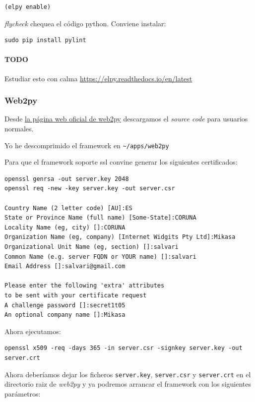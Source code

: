 \documentclass[12pt,spanish,]{scrartcl}
\let\oldparagraph\paragraph
\renewcommand{\paragraph}[1]{\oldparagraph{#1}\mbox{}}
\begin{document}
\begin{verbatim}
(elpy enable)
\end{verbatim}

\emph{flycheck} chequea el código python. Conviene instalar:

\begin{verbatim}
sudo pip install pylint
\end{verbatim}

\paragraph{TODO}\label{todo}

Estudiar esto con calma \url{https://elpy.readthedocs.io/en/latest}

\subsubsection{Web2py}\label{web2py}

Desde \href{http://www.web2py.com}{la página web oficial de web2py}
descargamos el \emph{source code} para usuarios normales.

Yo he descomprimido el framework en
\texttt{\textasciitilde{}/apps/web2py}

Para que el framework soporte ssl convine generar los siguientes
certificados:

\begin{verbatim}
openssl genrsa -out server.key 2048
openssl req -new -key server.key -out server.csr

Country Name (2 letter code) [AU]:ES
State or Province Name (full name) [Some-State]:CORUNA
Locality Name (eg, city) []:CORUNA
Organization Name (eg, company) [Internet Widgits Pty Ltd]:Mikasa
Organizational Unit Name (eg, section) []:salvari
Common Name (e.g. server FQDN or YOUR name) []:salvari
Email Address []:salvari@gmail.com

Please enter the following 'extra' attributes
to be sent with your certificate request
A challenge password []:secret1t05
An optional company name []:Mikasa
\end{verbatim}

Ahora ejecutamos:

\begin{verbatim}
openssl x509 -req -days 365 -in server.csr -signkey server.key -out server.crt
\end{verbatim}

Ahora deberíamos dejar los ficheros \texttt{server.key},
\texttt{server.csr} y \texttt{server.crt} en el directorio raiz de
\emph{web2py} y ya podremos arrancar el framework con los siguientes
parámetros:
\end{document}

